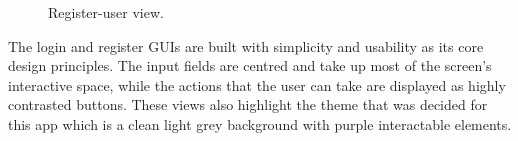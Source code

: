 \begin{figure}
\begin{minipage}{.5\textwidth}
      \caption{Register-user view.}
      \label{fig:result_register}
    \end{minipage}
\end{figure}

The login and register GUIs are built with simplicity and usability as its core design principles. The input fields are centred and take up most of the screen’s interactive space, while the actions that the user can take are displayed as highly contrasted buttons. These views also highlight the theme that was decided for this app which is a clean light grey background with purple interactable elements. 

